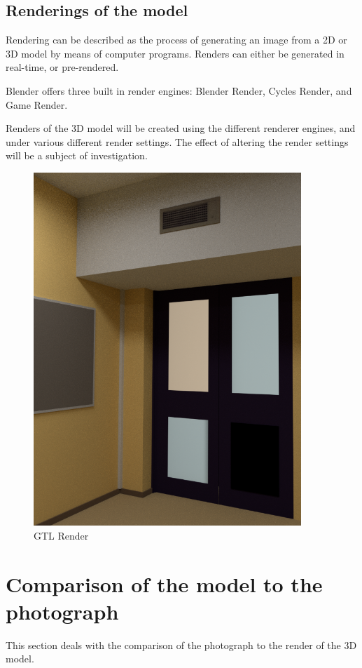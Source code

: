 \documentclass[11pt,a4paper]{report}
\begin{document}
			
		\subsection{Renderings of the model}
			Rendering can be described as the process of generating an image from a 2D or 3D model by means of computer programs. Renders can either be generated in real-time, or pre-rendered.
			
			Blender offers three built in render engines: Blender Render, Cycles Render, and Game Render.
			
			Renders of the 3D model will be created using the different renderer engines, and under various different render settings. The effect of altering the render settings will be a subject of investigation.
			
			\begin{figure}[H]
				\centering
				\includegraphics[width=0.9\textwidth]{gtl_render_1}
				\caption{GTL Render}
				\label{fig:gtl_render_1}
			\end{figure}
			
	\section{Comparison of the model to the photograph}
		This section deals with the comparison of the photograph to the render of the 3D model.
		
\end{document}
